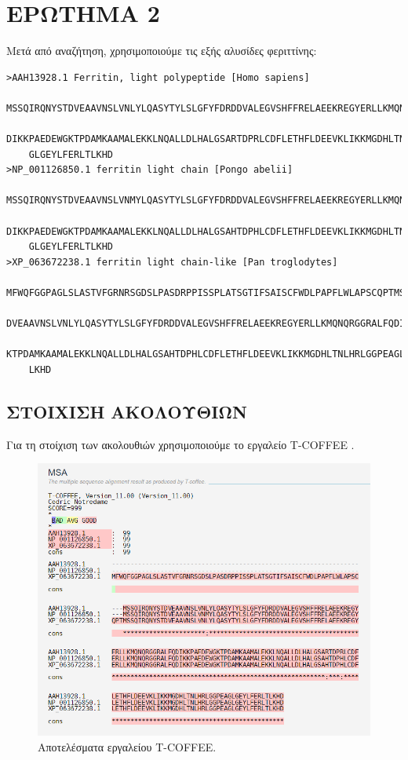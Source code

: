 \chapter{ΕΡΩΤΗΜΑ 2}
    Μετά από αναζήτηση, χρησιμοποιούμε τις εξής αλυσίδες φεριττίνης:
    \begin{graycomment} \footnotesize
    \begin{verbatim}
>AAH13928.1 Ferritin, light polypeptide [Homo sapiens]
    MSSQIRQNYSTDVEAAVNSLVNLYLQASYTYLSLGFYFDRDDVALEGVSHFFRELAEEKREGYERLLKMQNQRGGRALFQ
    DIKKPAEDEWGKTPDAMKAAMALEKKLNQALLDLHALGSARTDPRLCDFLETHFLDEEVKLIKKMGDHLTNLHRLGGPEA
    GLGEYLFERLTLKHD
>NP_001126850.1 ferritin light chain [Pongo abelii]
    MSSQIRQNYSTDVEAAVNSLVNMYLQASYTYLSLGFYFDRDDVALEGVSHFFRELAEEKREGYERLLKMQNQRGGRALFQ
    DIKKPAEDEWGKTPDAMKAAMALEKKLNQALLDLHALGSAHTDPHLCDFLETHFLDEEVKLIKKMGDHLTNLHRLGGPEA
    GLGEYLFERLTLKHD
>XP_063672238.1 ferritin light chain-like [Pan troglodytes]
    MFWQFGGPAGLSLASTVFGRNRSGDSLPASDRPPISSPLATSGTIFSAISCFWDLPAPFLWLAPSCQPTMSSQIRQNYST
    DVEAAVNSLVNLYLQASYTYLSLGFYFDRDDVALEGVSHFFRELAEEKREGYERLLKMQNQRGGRALFQDIKKPAEDEWG
    KTPDAMKAAMALEKKLNQALLDLHALGSAHTDPHLCDFLETHFLDEEVKLIKKMGDHLTNLHRLGGPEAGLGEYLFERLT
    LKHD\end{verbatim}
    \end{graycomment}

    \section{ΣΤΟΙΧΙΣΗ ΑΚΟΛΟΥΘΙΩΝ}
        Για τη στοίχιση των ακολουθιών χρησιμοποιούμε το εργαλείο T-COFFEE \cite{TCoffee}.

        \begin{figure}[H] \noindent \centering
            \includegraphics[scale=0.8]{img/T-Coffee}
            \caption{Αποτελέσματα εργαλείου T-COFFEE.}
        \end{figure}

